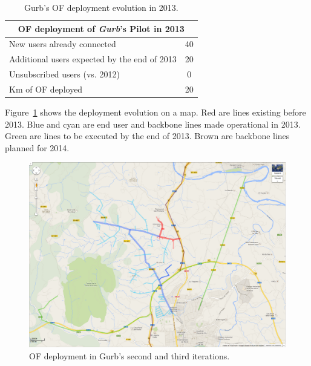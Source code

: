 \begin{table}[H]\small
  \begin{center}
    \begin{tabular}{|l|c|}
      \hline
      \multicolumn{2}{|c|}{\textbf{OF deployment of \emph{Gurb}'s Pilot in 2013}} \\
      \hline
      \hline
      New users already connected & 40 \\
      \hline
      Additional users expected by the end of 2013 & 20 \\
      \hline
      Unsubscribed users (vs. 2012) & 0 \\
      \hline
      Km of OF deployed & 20 \\
      \hline
    \end{tabular}
    \caption[Gurb pilot: pilot evolution 2013]{Gurb's OF deployment evolution in 2013.}
    \label{tab:gurb}
  \end{center}
\end{table}

Figure~\ref{fig:gurb_2013_detail} shows the deployment evolution on a map. Red are lines existing before 2013. Blue and cyan are end user and backbone lines made operational in 2013. Green are lines to be executed by the end of 2013. Brown are backbone lines planned for 2014.

\begin{figure}[H]
  \centering
  \includegraphics[width=0.95\linewidth]{sect2/figures/gurb_2013_detail.png}
  \caption[Gurb pilot: OF deployment map of 2nd and 3rd iterations]{OF deployment in Gurb's second and third iterations.}
  \label{fig:gurb_2013_detail}
\end{figure}

